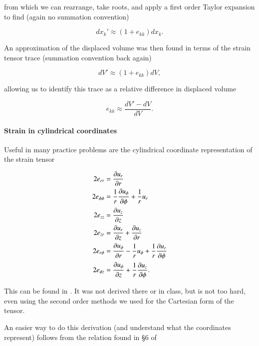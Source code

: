from which we can rearrange, take roots, and apply a first order Taylor expansion to find (again no summation convention)

\begin{equation}\label{eqn:continuumElasticityReview:150}
dx_k' \approx (1 + e_{kk}) dx_k.
\end{equation}

An approximation of the displaced volume was then found in terms of the strain tensor trace (summation convention back again)

\begin{equation}\label{eqn:continuumElasticityReview:170}
dV' \approx (1 + e_{kk}) dV,
\end{equation}

allowing us to identify this trace as a relative difference in displaced volume

\begin{equation}\label{eqn:continuumElasticityReview:190}
e_{kk} \approx \frac{dV' - dV}{dV}.
\end{equation}

\paragraph{Strain in cylindrical coordinates}

Useful in many practice problems are the cylindrical coordinate representation of the strain tensor 

\begin{align}\label{eqn:continuumElasticityReview:210}
2 e_{rr} &= \PD{r}{u_r}  \\
2 e_{\phi\phi} &= \inv{r} \PD{\phi}{u_\phi} +\inv{r} u_r  \\
2 e_{zz} &= \PD{z}{u_z}  \\
2 e_{zr} &= \PD{z}{u_r} + \PD{r}{u_z} \\
2 e_{r\phi} &= \PD{r}{u_\phi} - \inv{r} u_\phi + \inv{r} \PD{\phi}{u_r} \\
2 e_{\phi z} &= \PD{z}{u_\phi} +\inv{r} \PD{\phi}{u_z}.
\end{align}

This can be found in \cite{landau1960theory}.  It was not derived there or in class, but is not too hard, even using the second order methods we used for the Cartesian form of the tensor.

An easier way to do this derivation (and understand what the coordinates represent) follows from the relation found in \S 6 of \cite{acheson1990elementary}

